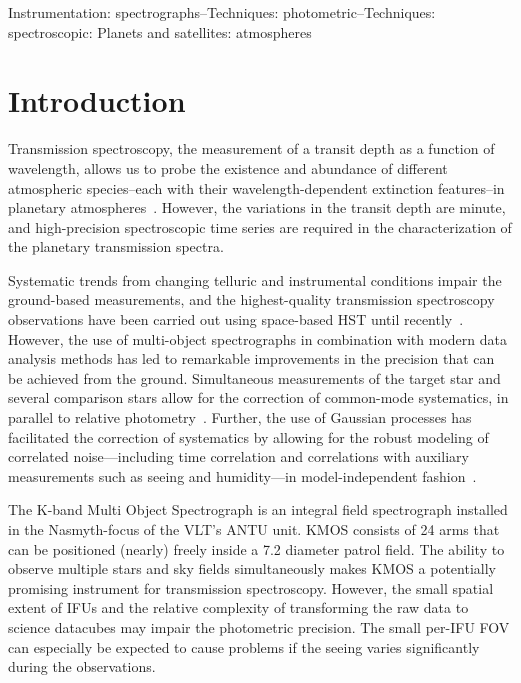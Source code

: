 \documentclass[useAMS,usenatbib]{mn2e}
\begin{document}
\begin{keywords}
Instrumentation: spectrographs--Techniques: photometric--Techniques: spectroscopic: Planets and satellites: atmospheres
\end{keywords}

\section{Introduction}
\label{sec:introduction}
Transmission spectroscopy, the measurement of a transit depth as a function of wavelength, allows us to probe the
existence and abundance of different atmospheric species--each with their wavelength-dependent extinction features--in
planetary atmospheres~\citep{Brown2001a}. However, the variations in the transit depth are minute, and high-precision
spectroscopic time series are required in the characterization of the planetary transmission spectra. 

Systematic trends from changing telluric and instrumental conditions impair the ground-based measurements, and the
highest-quality transmission spectroscopy observations have been carried out using space-based HST until
recently~\citep{Charbonneau2002,Berta2011,Sing2011a,Sing2013,Knutson2014,Evans2013}. However, the use of multi-object
spectrographs in combination with modern data analysis methods has led to remarkable improvements in the precision that
can be achieved from the ground. Simultaneous measurements of the target star and several comparison stars allow for the
correction of common-mode systematics, in parallel to relative
photometry~\citep{Bean2010a,Rabus2013,Gibson2012a,Gibson2013,Bean2013,Murgas2014}. Further, the use of Gaussian
processes has facilitated the correction of systematics by allowing for the robust modeling of correlated
noise---including time correlation and correlations with auxiliary measurements such as seeing and humidity---in
model-independent fashion~\citep{Gibson2011a,Roberts2013,Rasmussen2006}.

The K-band Multi Object Spectrograph \citep[KMOS,][]{Sharples2013} is an integral field spectrograph installed in the
Nasmyth-focus of the VLT's ANTU unit. KMOS consists of 24 arms that can be positioned (nearly) freely inside a
7.2\arcmin{} diameter patrol field. The ability to observe multiple stars and sky fields simultaneously makes KMOS a
potentially promising instrument for transmission spectroscopy. However, the small spatial extent of IFUs and the
relative complexity of transforming the raw data to science datacubes may impair the photometric precision. The small
per-IFU FOV can especially be expected to cause problems if the seeing varies significantly during the observations.
\end{document}
